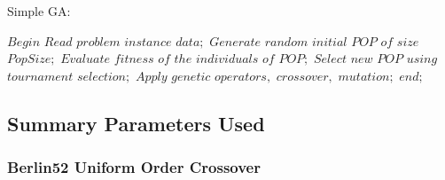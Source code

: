 \documentclass[conference]{IEEEtran}
\begin{document}
\begin{algorithm}
\caption{Simple GA:}
\label{GA}
\begin{algorithmic}[1]
	\State $Begin$
	\State $Read $ $problem $ $instance $ $data;$
	\State $Generate $ $random $ $initial $ $POP $ $of  $ $size $ $PopSize;$
        \State $Evaluate $ $fitness $ $of $ 			$the $ $individuals $ $of $ $POP;$
        \State $Select $ $new $ $POP $ $using $ $tournament $ $selection;$
        \State $Apply $ $genetic $ 						$operators, $ $crossover,$				$mutation;$
	\EndFor
	\State $end;$
\EndProcedure
\end{algorithmic}
\end{algorithm}

\subsection{Summary Parameters Used}
\subsubsection{Berlin52 Uniform Order Crossover}
\end{document}
